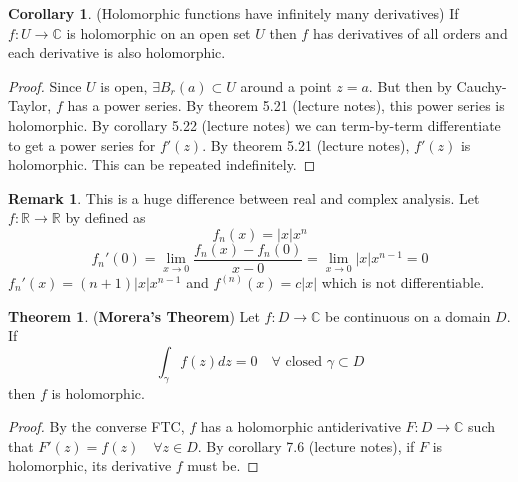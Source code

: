 \documentclass[12pt,a4paper]{article}
\theoremstyle{definition}
\newtheorem{theorem}[definition]{Theorem}
\newtheorem{corollary}[definition]{Corollary}
\newtheorem*{remark}{Remark}
\begin{document}
\begin{corollary}
	(Holomorphic functions have infinitely many derivatives) If $f: U \rightarrow \mathbb{C}$ is holomorphic on an open set $U$ then $f$ has derivatives of all orders and each derivative is also holomorphic.
\end{corollary}

\begin{proof}
	Since $U$ is open, $\exists B_r(a) \subset U$ around a point $z = a$. But then by Cauchy-Taylor, $f$ has a power series. By theorem 5.21 (lecture notes), this power series is holomorphic. By corollary 5.22 (lecture notes) we can term-by-term differentiate to get a power series for $f'(z)$. By theorem 5.21 (lecture notes), $f'(z)$ is holomorphic. This can be repeated indefinitely.
\end{proof}

\begin{remark}
	This is a huge difference between real and complex analysis. Let $f: \mathbb{R} \rightarrow \mathbb{R}$ by defined as
	\[
		f_n(x) = |x| x^n
	\]
	\[
		f_n'(0) = \lim_{x \rightarrow 0} \frac{f_n(x) - f_n(0)}{x - 0} = \lim_{x \rightarrow 0} |x| x^{n - 1} = 0
	\]
	$f_n'(x) = (n + 1) |x| x^{n - 1}$ and $f^{(n)} (x) = c|x|$ which is not differentiable.
\end{remark}

\begin{theorem}
	(\textbf{Morera's Theorem}) Let $f: D \rightarrow \mathbb{C}$ be continuous on a domain $D$. If
	\[
		\int_{\gamma} f(z) dz = 0 \quad \forall \text{ closed } \gamma \subset D
	\]
	then $f$ is holomorphic.
\end{theorem}

\begin{proof}
	By the converse FTC, $f$ has a holomorphic antiderivative $F: D \rightarrow \mathbb{C}$ such that $F'(z) = f(z) \quad \forall z \in D$. By corollary 7.6 (lecture notes), if $F$ is holomorphic, its derivative $f$ must be.
\end{proof}
\end{document}
